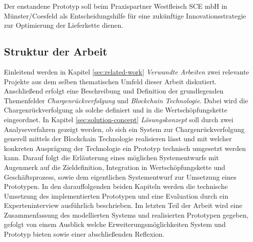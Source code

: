 Der enstandene Prototyp soll beim Praxispartner Westfleisch SCE mbH in Münster/Coesfeld als Entscheidungshilfe für eine zukünftige Innovationsstrategie zur Optimierung der Lieferkette dienen.

\subsection{Struktur der Arbeit}
Einleitend werden in Kapitel \ref{sec:related-work} \textit{Verwandte Arbeiten} zwei relevante Projekte aus dem selben thematischen Umfeld dieser Arbeit diskutiert. Anschließend erfolgt eine Beschreibung und Definition der grundlegenden Themenfelder \textit{Chargenrückverfolgung} und \textit{Blockchain Technologie}. Dabei wird die Chargenrückverfolgung als solche definiert und in die Wertschöpfungskette eingeordnet. In Kapitel \ref{sec:solution-concept} \textit{Lösungskonzept} soll durch zwei Analyseverfahren gezeigt werden, ob sich ein System zur Chargenrückverfolgung generell mittels der Blockchain Technologie realisieren lässt und mit welcher konkreten Ausprägung der Technologie ein Prototyp technisch umgesetzt werden kann. Darauf folgt die Erläuterung eines möglichen Systementwurfs mit Augenmerk auf die Zieldefinition, Integration in Wertschöpfungskette und Geschäftsprozess, sowie dem eigentlichen Systementwurf zur Umsetzung eines Prototypen. In den darauffolgenden beiden Kapiteln werden die technische Umsetzung des implementierten Prototypen und eine Evaluation durch ein Experteninterview ausführlich beschrieben. Im letzten Teil der Arbeit wird eine Zusammenfassung des modellierten Systems und realisierten Prototypen gegeben, gefolgt von einem Ausblick welche Erweiterungsmöglichkeiten System und Prototyp bieten sowie einer abschließenden Reflexion.
